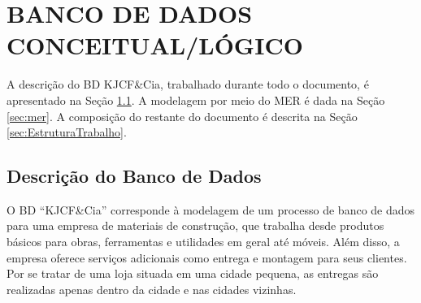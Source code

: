 \documentclass[
12pt,
a4paper,
semrecuonosumario,
sumario = abnt-6027-2012]{report}
\begin{document}
\chapter{BANCO DE DADOS CONCEITUAL/LÓGICO}

	A descrição do BD KJCF\&Cia, trabalhado durante todo o documento, é apresentado na Seção \ref{sec:DescricaoBD}. A modelagem por meio do MER é dada na Seção \ref{sec:mer}. A composição do restante do documento é descrita na Seção \ref{sec:EstruturaTrabalho}.
	
    \section{Descrição do Banco de Dados}\label{sec:DescricaoBD}
	O BD “KJCF\&Cia” corresponde à modelagem de um processo de banco de dados para uma empresa de materiais de construção, que trabalha desde produtos básicos para obras, ferramentas e utilidades em geral até móveis. Além disso, a empresa oferece serviços adicionais como entrega e montagem para seus clientes. Por se tratar de uma loja situada em uma cidade pequena, as entregas são realizadas apenas dentro da cidade e nas cidades vizinhas.
	
\end{document}
